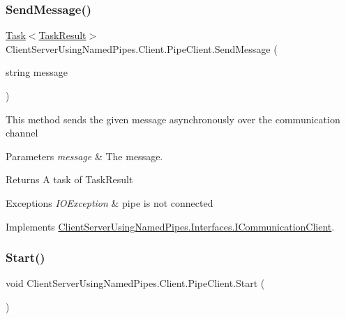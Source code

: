 \subsubsection{\texorpdfstring{Send\+Message()}{SendMessage()}}
{\footnotesize\ttfamily \hyperlink{class_system_1_1_threading_1_1_tasks_1_1_task}{Task}$<$\hyperlink{class_client_server_using_named_pipes_1_1_utilities_1_1_task_result}{Task\+Result}$>$ Client\+Server\+Using\+Named\+Pipes.\+Client.\+Pipe\+Client.\+Send\+Message (\begin{DoxyParamCaption}\item[{string}]{message }\end{DoxyParamCaption})\hspace{0.3cm}{\ttfamily [inline]}}



This method sends the given message asynchronously over the communication channel 


\begin{DoxyParams}{Parameters}
{\em message} & The message.\\
\hline
\end{DoxyParams}
\begin{DoxyReturn}{Returns}
A task of Task\+Result
\end{DoxyReturn}

\begin{DoxyExceptions}{Exceptions}
{\em I\+O\+Exception} & pipe is not connected\\
\hline
\end{DoxyExceptions}


Implements \hyperlink{interface_client_server_using_named_pipes_1_1_interfaces_1_1_i_communication_client_a07c2acf92bd0b99d704156010b47eff1}{Client\+Server\+Using\+Named\+Pipes.\+Interfaces.\+I\+Communication\+Client}.

\mbox{\label{class_client_server_using_named_pipes_1_1_client_1_1_pipe_client_a0bb2855199630657cdf070e3c4275b51}} 
\subsubsection{\texorpdfstring{Start()}{Start()}}
{\footnotesize\ttfamily void Client\+Server\+Using\+Named\+Pipes.\+Client.\+Pipe\+Client.\+Start (\begin{DoxyParamCaption}{ }\end{DoxyParamCaption})\hspace{0.3cm}{\ttfamily [inline]}}



